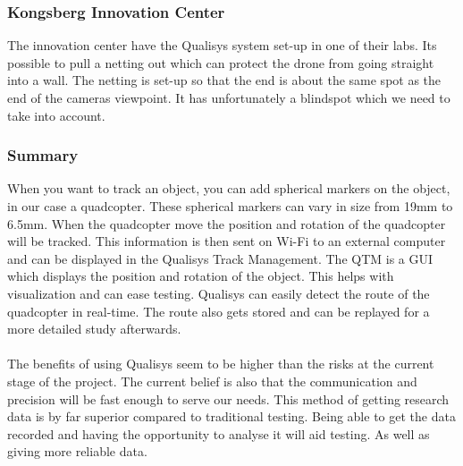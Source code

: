 \subsubsection{Kongsberg Innovation Center}
The innovation center have the Qualisys system set-up in one of their labs. Its possible to pull a netting out which can protect the drone from going straight into a wall. The netting is set-up so that the end is about the same spot as the end of the cameras viewpoint. It has unfortunately a blindspot which we need to take into account. \\

\subsubsection{Summary}
When you want to track an object, you can add spherical markers on the object, in our case a quadcopter. These spherical markers can vary in size from 19mm to 6.5mm. When the quadcopter move the position and rotation of the quadcopter will be tracked. This information is then sent on Wi-Fi to an external computer and can be displayed in the Qualisys Track Management. The QTM is a GUI which displays the position and rotation of the object. This helps with visualization and can ease testing. Qualisys can easily detect the route of the quadcopter in real-time. The route also gets stored and can be replayed for a more detailed study afterwards. \\
\\
The benefits of using Qualisys seem to be higher than the risks at the current stage of the project. The current belief is also that the communication and precision will be fast enough to serve our needs. This method of getting research data is by far superior compared to traditional testing. Being able to get the data recorded and having the opportunity to analyse it will aid testing. As well as giving more reliable data. 

